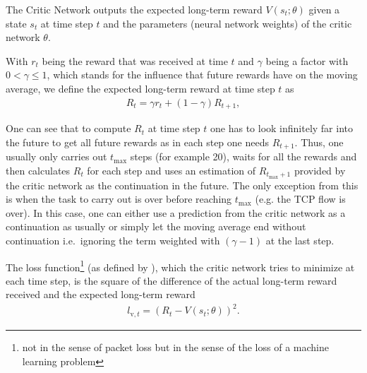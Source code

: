 \documentclass[newfonts=false,format=sigconf,10pt,letterpaper]{acmart}
\newcommand\note[2]{{\color{#1}#2}}
\newcommand\todo[1]{{\note{red}{TODO: #1}}}
\begin{document}
The Critic Network outputs the expected long-term reward $V(s_{t}; \theta)$ given a state $s_t$ at time step $t$ and the parameters (neural network weights) of the critic network $\theta$.

With $r_t$ being the reward that was received at time $t$ and $\gamma$ being a factor with $0 < \gamma \leq 1$, which stands for the influence that future rewards have on the moving average, we define the expected long-term reward at time step $t$ as 
\begin{align}
R_t = \gamma r_{t} + (1-\gamma) R_{t+1} ,
\end{align}

One can see that to compute $R_t$ at time step $t$ one has to look infinitely far into the future to get all future rewards as in each step one needs $R_{t+1}$. Thus, one usually only carries out $t_\text{max}$ steps (for example 20), waits for all the rewards and then calculates $R_t$ for each step and uses an estimation of $R_{t_\text{max}+1}$ provided by the critic network as the continuation in the future. The only exception from this is when the task to carry out is over before reaching $t_\text{max}$ (e.g. the TCP flow is over). In this case, one can either use a prediction from the critic network as a continuation as usually or simply let the moving average end without continuation i.e.~ignoring the term weighted with $(\gamma-1)$ at the last step. 



The loss function\footnote{not in the sense of packet loss but in the sense of the loss of a machine learning problem} (as defined by \cite{mnih_asynchronous_2016}), which the critic network tries to minimize at each time step, is the square of the difference of the actual long-term reward received and the expected long-term reward
\begin{align}
l_{\text{v},t} = \left(R_t - V(s_t; \theta)\right)^2.
\end{align}
\end{document}
